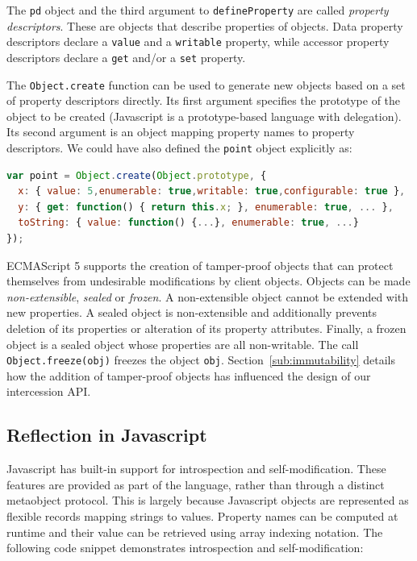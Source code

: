 \documentclass{sig-alternate}
\begin{document}
The \texttt{pd} object and the third argument to \texttt{defineProperty} are called \emph{property descriptors}. These are objects that describe properties of objects. Data property descriptors declare a \texttt{value} and a \texttt{writable} property, while accessor property descriptors declare a \texttt{get} and/or a \texttt{set} property.

The \texttt{Object.create} function can be used to generate new objects based on a set of property descriptors directly. Its first argument specifies the prototype of the object to be created (Javascript is a prototype-based language with delegation). Its second argument is an object mapping property names to property descriptors. We could have also defined the \texttt{point} object explicitly as:

\begin{lstlisting}[language=javascript]
var point = Object.create(Object.prototype, {
  x: { value: 5,enumerable: true,writable: true,configurable: true },
  y: { get: function() { return this.x; }, enumerable: true, ... },
  toString: { value: function() {...}, enumerable: true, ...}
});
\end{lstlisting}

ECMAScript 5 supports the creation of tamper-proof objects that can protect themselves from undesirable modifications by client objects. Objects can be made \emph{non-extensible}, \emph{sealed} or \emph{frozen}. A non-extensible object cannot be extended with new properties. A sealed object is non-extensible and additionally prevents deletion of its properties or alteration of its property attributes. Finally, a frozen object is a sealed object whose properties are all non-writable. The call \texttt{Object.freeze(obj)} freezes the object \texttt{obj}. Section~\ref{sub:immutability} details how the addition of tamper-proof objects has influenced the design of our intercession API.

\subsection{Reflection in Javascript}
\label{sub:introspection_in_js}

Javascript has built-in support for introspection and self-modification. These features are provided as part of the language, rather than through a distinct metaobject protocol. This is largely because Javascript objects are represented as flexible records mapping strings to values. Property names can be computed at runtime and their value can be retrieved using array indexing notation. The following code snippet demonstrates introspection and self-modification:
\end{document}

